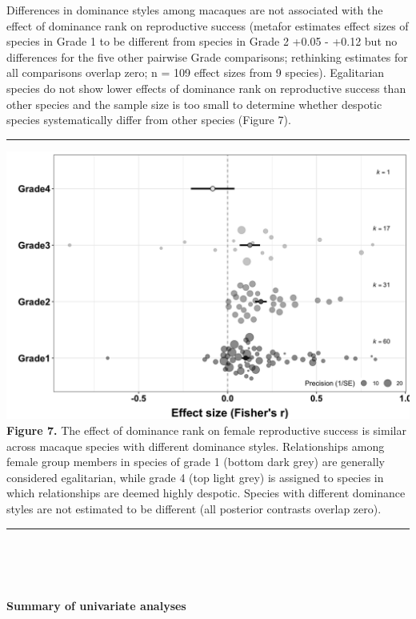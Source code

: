 \documentclass[
]{article}
\begin{document}
Differences in dominance styles among macaques are not associated with
the effect of dominance rank on reproductive success (metafor estimates
effect sizes of species in Grade 1 to be different from species in Grade
2 +0.05 - +0.12 but no differences for the five other pairwise Grade
comparisons; rethinking estimates for all comparisons overlap zero; n =
109 effect sizes from 9 species). Egalitarian species do not show lower
effects of dominance rank on reproductive success than other species and
the sample size is too small to determine whether despotic species
systematically differ from other species (Figure 7).

\begin{center}\rule{0.5\linewidth}{0.5pt}\end{center}

\includegraphics{ranksuccess_Fig9_effectsizes_macaquedominancestyles.png}
\textbf{Figure 7.} The effect of dominance rank on female reproductive
success is similar across macaque species with different dominance
styles. Relationships among female group members in species of grade 1
(bottom dark grey) are generally considered egalitarian, while grade 4
(top light grey) is assigned to species in which relationships are
deemed highly despotic. Species with different dominance styles are not
estimated to be different (all posterior contrasts overlap zero).

\begin{center}\rule{0.5\linewidth}{0.5pt}\end{center}

~

~

\hypertarget{summary-of-univariate-analyses}{%
\paragraph{\texorpdfstring{\textbf{Summary of univariate
analyses}}{Summary of univariate analyses}}\label{summary-of-univariate-analyses}}
\end{document}
